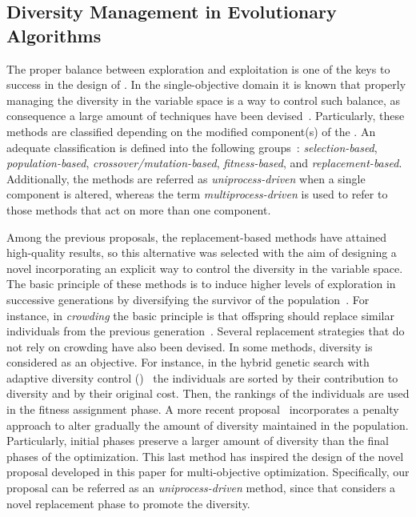 

\subsection{Diversity Management in Evolutionary Algorithms}

The proper balance between exploration and exploitation is one of the keys to success in the design of \EAS{}.
%
In the single-objective domain it is known that properly managing the diversity in the variable space is a way to control such balance,
as consequence a large amount of techniques have been devised~\cite{Mohan:14}.
%
Particularly, these methods are classified depending on the modified component(s) of the \EA{}.
%
An adequate classification is defined into the following groups~\cite{Joel:Crepinsek}: \textit{selection-based}, \textit{population-based}, 
\textit{crossover/mutation-based}, \textit{fitness-based}, and \textit{replacement-based}.
%
Additionally, the methods are referred as \textit{uniprocess-driven} when a single component is altered, whereas the term
\textit{multiprocess-driven} is used to refer to those methods that act on more than one component.

Among the previous proposals, the replacement-based methods have attained high-quality results, so
this alternative was selected with the aim of designing a novel \MOEA{} incorporating an explicit way to control the diversity 
in the variable space.
%
The basic principle of these methods is to induce higher levels of exploration in successive generations by diversifying 
the survivor of the population~\cite{Segura:17}.
%
For instance, in \textit{crowding} the basic principle is that offspring should replace similar individuals from the previous generation~\cite{Mengshoel:14}.
%
Several replacement strategies that do not rely on crowding have also been devised.
%
In some methods, diversity is considered as an objective.
%
For instance, in the hybrid genetic search with adaptive diversity control (\HGSADC{})~\cite{Vidal:13} the individuals are sorted by their contribution to diversity and by their original cost.
%
Then, the rankings of the individuals are used in the fitness assignment phase.
%
A more recent proposal~\cite{Segura:17} incorporates a penalty approach to alter gradually the amount of diversity maintained in the population.
%
Particularly, initial phases preserve a larger amount of diversity than the final phases of the optimization.
%
This last method has inspired the design of the novel proposal developed in this paper for multi-objective optimization.
%
Specifically, our proposal can be referred as an \textit{uniprocess-driven} method, since that considers a novel replacement phase to promote the diversity.
%

